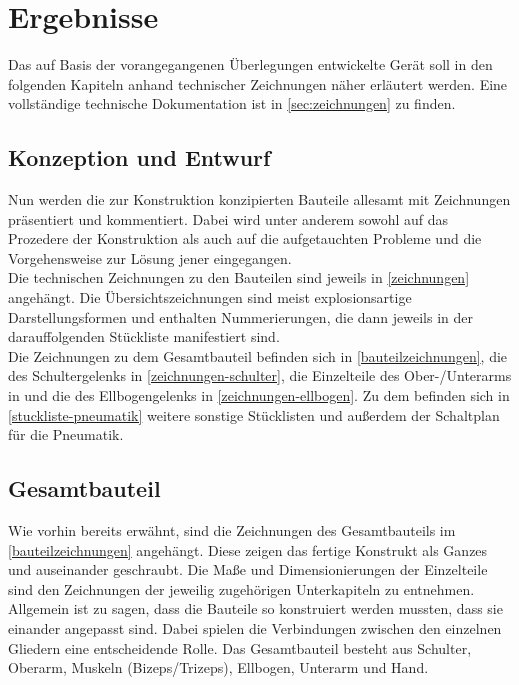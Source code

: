 \chapter{Ergebnisse}
	Das auf Basis der vorangegangenen Überlegungen entwickelte Gerät soll in den folgenden Kapiteln anhand technischer Zeichnungen näher erläutert werden.
	Eine vollständige technische Dokumentation ist in \cref{sec:zeichnungen} zu finden.
	\section{Konzeption und Entwurf}
		Nun werden die zur Konstruktion konzipierten Bauteile allesamt mit Zeichnungen präsentiert und kommentiert.
		Dabei wird unter anderem sowohl auf das Prozedere der Konstruktion als auch auf die aufgetauchten Probleme und die Vorgehensweise zur Lösung jener eingegangen.\\
		Die technischen Zeichnungen zu den Bauteilen sind jeweils in \cref{zeichnungen} angehängt.
		Die Übersichtszeichnungen sind meist explosionsartige Darstellungsformen und enthalten Nummerierungen, die dann jeweils in der darauffolgenden Stückliste manifestiert sind.\\
		Die Zeichnungen zu dem Gesamtbauteil befinden sich in \cref{bauteilzeichnungen}, die des Schultergelenks in \cref{zeichnungen-schulter}, die Einzelteile des Ober-/Unterarms in  und die des Ellbogengelenks in \cref{zeichnungen-ellbogen}.
		Zu dem befinden sich in \cref{stuckliste-pneumatik} weitere sonstige Stücklisten und außerdem der Schaltplan für die Pneumatik.
		
	\section{Gesamtbauteil}
		Wie vorhin bereits erwähnt, sind die Zeichnungen des Gesamtbauteils im \cref{bauteilzeichnungen} angehängt.
		Diese zeigen das fertige Konstrukt als Ganzes und auseinander geschraubt.
		Die Maße und Dimensionierungen der Einzelteile sind den Zeichnungen der jeweilig zugehörigen Unterkapiteln zu entnehmen.\\
		Allgemein ist zu sagen, dass die Bauteile so konstruiert werden mussten, dass sie einander angepasst sind.
		Dabei spielen die Verbindungen zwischen den einzelnen Gliedern eine entscheidende Rolle.
		Das Gesamtbauteil besteht aus Schulter, Oberarm, Muskeln (Bizeps/Trizeps), Ellbogen, Unterarm und Hand.
	

